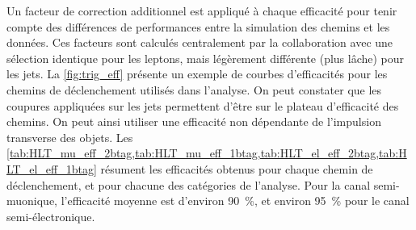 Un facteur de correction additionnel est appliqué à chaque efficacité pour tenir compte des différences de performances entre la simulation des chemins et les données. Ces facteurs sont calculés centralement par la collaboration avec une sélection identique pour les leptons, mais légèrement différente (plus lâche) pour les jets. La \cref{fig:trig_eff} présente un exemple de courbes d'efficacités pour les chemins de déclenchement utilisés dans l'analyse. On peut constater que les coupures appliquées sur les jets permettent d'être sur le plateau d'efficacité des chemins. On peut ainsi utiliser une efficacité non dépendante de l'impulsion transverse des objets. Les \cref{tab:HLT_mu_eff_2btag,tab:HLT_mu_eff_1btag,tab:HLT_el_eff_2btag,tab:HLT_el_eff_1btag} résument les efficacités obtenus pour chaque chemin de déclenchement, et pour chacune des catégories de l'analyse. Pour la canal semi-muonique, l'efficacité moyenne est d'environ \SI{90}{\%}, et environ \SI{95}{\%} pour le canal semi-électronique.



